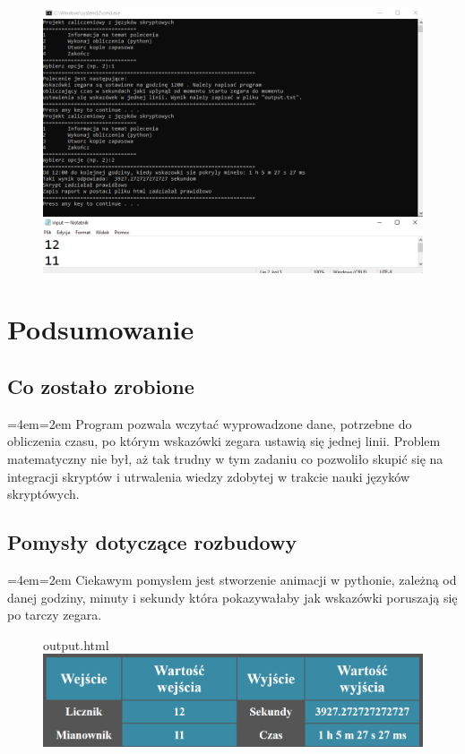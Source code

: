 \documentclass[12pt,a4paper]{article}
\newenvironment{blockquote}{%
  \par%
  \medskip
  \leftskip=4em\rightskip=2em%
  \noindent\ignorespaces}{%
  \par\medskip}
\begin{document}
	

	
	\begin{figure}[!htb]
	    \centering
	    \includegraphics{dzialanie.PNG}
	\end{figure}
	

	
	\newpage
	
    \newpage
	\section{Podsumowanie}
	
	\subsection{Co zostało zrobione}
	\begin{blockquote}
        Program pozwala wczytać wyprowadzone dane, potrzebne do obliczenia czasu, po którym wskazówki zegara ustawią się  jednej linii. Problem matematyczny nie był, aż tak trudny w tym zadaniu co pozwoliło skupić się na integracji skryptów i utrwalenia wiedzy zdobytej w trakcie nauki języków skryptówych.
    \end{blockquote}
    \subsection{Pomysły dotyczące rozbudowy}
	\begin{blockquote}
        Ciekawym pomysłem jest stworzenie animacji w pythonie, zależną od danej godziny, minuty i sekundy która pokazywałaby jak wskazówki poruszają się po tarczy zegara.
    \end{blockquote}

    		\begin{figure}[!htb]
	    \centering
	    output.html
	    \includegraphics[scale=0.25]{htmlout.PNG}
	\end{figure}
\end{document}
